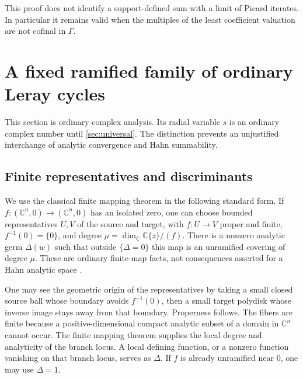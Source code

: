 \documentclass[11pt,letterpaper]{article}
\theoremstyle{definition}
\theoremstyle{remark}
\newcommand{\C}{\mathbb C}\newcommand{\R}{\mathbb R}
\numberwithin{equation}{section}
\begin{document}
This proof does not identify a support-defined sum with a limit of Picard
iterates. In particular it remains valid when the multiples of the least
coefficient valuation are not cofinal in $\Gamma$.

\section{A fixed ramified family of ordinary Leray cycles}
\label{sec:ordinary}

This section is ordinary complex analysis. Its radial variable $s$ is an
ordinary complex number until \cref{sec:universal}. The distinction prevents
an unjustified interchange of analytic convergence and Hahn summability.

\subsection{Finite representatives and discriminants}
We use the classical finite mapping theorem in the following standard form.
If $f:(\C^n,0)\to(\C^n,0)$ has an isolated zero, one can choose bounded
representatives $U,V$ of the source and target, with $f:U\to V$ proper and
finite, $f^{-1}(0)=\{0\}$, and degree
$\mu=\dim_\C\C\{z\}/(f)$. There is a nonzero analytic germ
$\Delta(w)$ such that outside $\{\Delta=0\}$ this map is an unramified
covering of degree $\mu$. These are ordinary finite-map facts, not consequences
asserted for a Hahn analytic space \cite[Chapters II--III]{GR}.

One may see the geometric origin of the representatives by taking a small
closed source ball whose boundary avoids $f^{-1}(0)$, then a small target
polydisk whose inverse image stays away from that boundary. Properness follows.
The fibers are finite because a positive-dimensional compact analytic subset
of a domain in $\C^n$ cannot occur. The finite mapping theorem supplies the
local degree and analyticity of the branch locus. A local defining function,
or a nonzero function vanishing on that branch locus, serves as $\Delta$.
If $f$ is already unramified near $0$, one may use $\Delta=1$.
\end{document}
